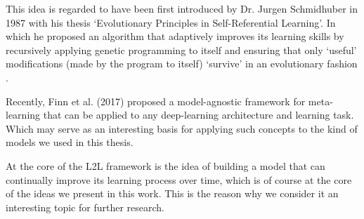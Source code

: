 \documentclass[../main.tex]{subfiles}
\begin{document}
    This idea is regarded to have been first introduced by Dr. Jurgen Schmidhuber in 1987 with his thesis `Evolutionary Principles in Self-Referential Learning'. In which he proposed an algorithm that adaptively improves its learning skills by recursively applying genetic programming to itself and ensuring that only `useful' modifications (made by the program to itself) `survive' in an evolutionary fashion \cite{schmidhuber_evolutionary_1987}.
    
    Recently, Finn et al. (2017) \cite{finn_model-agnostic_2017} proposed a model-agnostic framework for meta-learning that can be applied to any deep-learning architecture and learning task. Which may serve as an interesting basis for applying such concepts to the kind of models we used in this thesis.

    At the core of the L2L framework is the idea of building a model that can continually improve its learning process over time, which is of course at the core of the ideas we present in this work. This is the reason why we consider it an interesting topic for further research.

    

  

\end{document}
